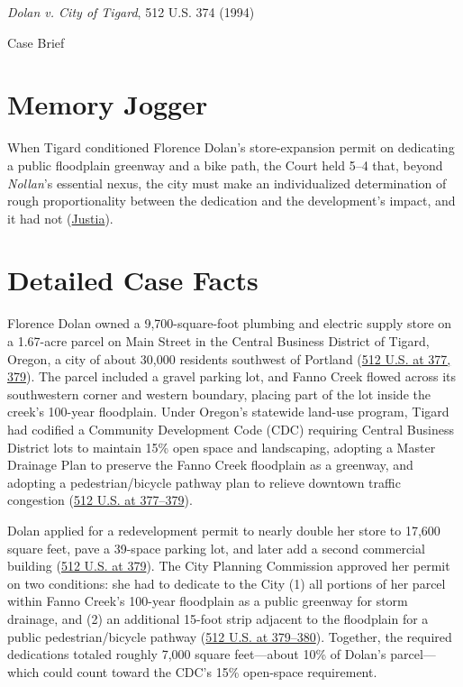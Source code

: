 \documentclass[12pt]{article}
\begin{document}
\begin{center}
{\LARGE \textit{Dolan v. City of Tigard}, 512 U.S. 374 (1994)\par}
\vspace{0.8em}
{\large Case Brief\par}
\end{center}
\vspace{1em}

\section{Memory Jogger}
When Tigard conditioned Florence Dolan's store-expansion permit on dedicating a public floodplain greenway and a bike path, the Court held 5--4 that, beyond \textit{Nollan}'s essential nexus, the city must make an individualized determination of rough proportionality between the dedication and the development's impact, and it had not (\href{https://supreme.justia.com/cases/federal/us/512/374/}{Justia}).

\section{Detailed Case Facts}
Florence Dolan owned a 9,700-square-foot plumbing and electric supply store on a 1.67-acre parcel on Main Street in the Central Business District of Tigard, Oregon, a city of about 30,000 residents southwest of Portland (\href{https://supreme.justia.com/cases/federal/us/512/374/}{512 U.S. at 377, 379}). The parcel included a gravel parking lot, and Fanno Creek flowed across its southwestern corner and western boundary, placing part of the lot inside the creek's 100-year floodplain. Under Oregon's statewide land-use program, Tigard had codified a Community Development Code (CDC) requiring Central Business District lots to maintain 15\% open space and landscaping, adopting a Master Drainage Plan to preserve the Fanno Creek floodplain as a greenway, and adopting a pedestrian/bicycle pathway plan to relieve downtown traffic congestion (\href{https://supreme.justia.com/cases/federal/us/512/374/}{512 U.S. at 377--379}).

Dolan applied for a redevelopment permit to nearly double her store to 17,600 square feet, pave a 39-space parking lot, and later add a second commercial building (\href{https://supreme.justia.com/cases/federal/us/512/374/}{512 U.S. at 379}). The City Planning Commission approved her permit on two conditions: she had to dedicate to the City (1) all portions of her parcel within Fanno Creek's 100-year floodplain as a public greenway for storm drainage, and (2) an additional 15-foot strip adjacent to the floodplain for a public pedestrian/bicycle pathway (\href{https://supreme.justia.com/cases/federal/us/512/374/}{512 U.S. at 379--380}). Together, the required dedications totaled roughly 7,000 square feet---about 10\% of Dolan's parcel---which could count toward the CDC's 15\% open-space requirement.
\end{document}

